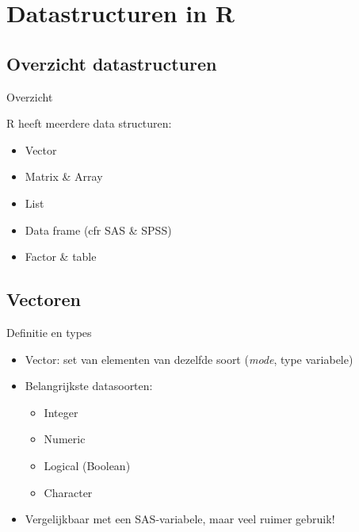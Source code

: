 \documentclass{beamer}
\begin{document}

\section{Datastructuren in R}

\subsection{Overzicht datastructuren}

\begin{frame}{Overzicht}

R heeft meerdere data structuren: 

\begin{itemize}
  \item Vector
  \item Matrix \& Array
  \item List
  \item Data frame (cfr SAS \& SPSS)
  \item Factor \& table
\end{itemize}

\end{frame}


\subsection{Vectoren}

\begin{frame}{Definitie en types}

\begin{itemize}
  \item Vector: set van elementen van dezelfde soort (\textit{mode}, type variabele)
  \item Belangrijkste datasoorten: 
  
    \begin{itemize}
    \item Integer
    \item Numeric 
    \item Logical (Boolean)
    \item Character
    \end{itemize}
  \item Vergelijkbaar met een SAS-variabele, maar veel ruimer gebruik!
\end{itemize}

\end{frame}
\end{document}
